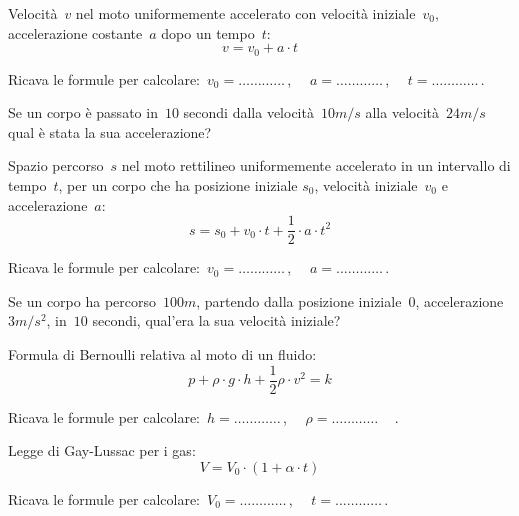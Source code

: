 \begin{esercizio}
\label{ese:20.61}
Velocità~$v$ nel moto uniformemente accelerato con velocità iniziale~$v_0$, 
accelerazione costante~$a$ dopo un tempo~$t$:
\begin{equation*}
  v=v_{0}+a\cdot t
\end{equation*}

Ricava le formule per calcolare:~$v_0=\ldots\ldots\ldots\ldots$\,, $\quad 
a=\ldots\ldots\ldots\ldots$\,, $\quad t =\ldots\ldots\ldots\ldots$\,.

Se un corpo è passato in~$10$ secondi dalla velocità~$10\unit{m/s}$ alla 
velocità~$24\unit{m/s}$ qual è stata la sua accelerazione?
\end{esercizio}

\begin{esercizio}
\label{ese:20.62}
Spazio percorso~$s$ nel moto rettilineo uniformemente accelerato in un 
intervallo di tempo~$t$, per un corpo che ha posizione iniziale
$s_0$, velocità iniziale~$v_0$ e accelerazione~$a$:
\begin{equation*}
  s=s_{0}+v_{0}\cdot t+\dfrac{1}{2}\cdot a\cdot t^{2}
\end{equation*}

Ricava le formule per calcolare:~$v_0=\ldots\ldots\ldots\ldots$\,, $\quad 
a=\ldots\ldots\ldots\ldots$\,.

Se un corpo ha percorso~$100\unit{m}$, partendo dalla posizione iniziale~$0$, 
accelerazione~$3\unit{m/s^2}$, in~$10$ secondi, qual'era la sua velocità 
iniziale?
\end{esercizio}

\begin{esercizio}
\label{ese:20.63}
Formula di Bernoulli relativa al moto di un fluido:
\begin{equation*}
  p+\rho \cdot g\cdot h+\dfrac{1}{2}\rho \cdot v^{2}=k
\end{equation*}

Ricava le formule per calcolare:~$h=\ldots\ldots\ldots\ldots$\,, $\quad 
\rho=\ldots\ldots\ldots\ldots\quad$\,.
\end{esercizio}

\begin{esercizio}
\label{ese:20.64}
Legge di Gay-Lussac per i gas:
\begin{equation*}
  V=V_{0}\cdot (1+\alpha \cdot t)
\end{equation*}

Ricava le formule per calcolare:~$V_0=\ldots\ldots\ldots\ldots$\,, $\quad 
t=\ldots\ldots\ldots\ldots$\,.
\end{esercizio}

